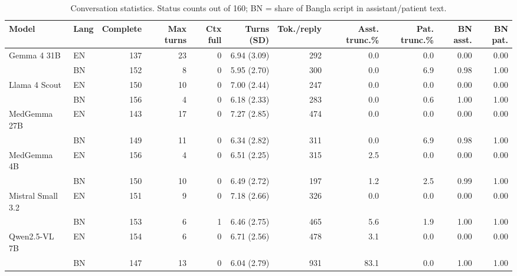 \begin{table}[!htbp]
\centering
\scriptsize
\begin{tabular}{llrrrrrrrrr}
\toprule
Model & Lang & Complete & Max turns & Ctx full & Turns (SD) & Tok./reply & Asst. trunc.\% & Pat. trunc.\% & BN asst. & BN pat. \\
\midrule
Gemma 4 31B & EN & 137 & 23 & 0 & 6.94 (3.09) & 292 & 0.0 & 0.0 & 0.00 & 0.00 \\
 & BN & 152 & 8 & 0 & 5.95 (2.70) & 300 & 0.0 & 6.9 & 0.98 & 1.00 \\
Llama 4 Scout & EN & 150 & 10 & 0 & 7.00 (2.44) & 247 & 0.0 & 0.0 & 0.00 & 0.00 \\
 & BN & 156 & 4 & 0 & 6.18 (2.33) & 283 & 0.0 & 0.6 & 1.00 & 1.00 \\
MedGemma 27B & EN & 143 & 17 & 0 & 7.27 (2.85) & 474 & 0.0 & 0.0 & 0.00 & 0.00 \\
 & BN & 149 & 11 & 0 & 6.34 (2.82) & 311 & 0.0 & 6.9 & 0.98 & 1.00 \\
MedGemma 4B & EN & 156 & 4 & 0 & 6.51 (2.25) & 315 & 2.5 & 0.0 & 0.00 & 0.00 \\
 & BN & 150 & 10 & 0 & 6.49 (2.72) & 197 & 1.2 & 2.5 & 0.99 & 1.00 \\
Mistral Small 3.2 & EN & 151 & 9 & 0 & 7.18 (2.66) & 326 & 0.0 & 0.0 & 0.00 & 0.00 \\
 & BN & 153 & 6 & 1 & 6.46 (2.75) & 465 & 5.6 & 1.9 & 1.00 & 1.00 \\
Qwen2.5-VL 7B & EN & 154 & 6 & 0 & 6.71 (2.56) & 478 & 3.1 & 0.0 & 0.00 & 0.00 \\
 & BN & 147 & 13 & 0 & 6.04 (2.79) & 931 & 83.1 & 0.0 & 1.00 & 1.00 \\
\bottomrule
\end{tabular}
\caption{Conversation statistics. Status counts out of 160; BN = share of Bangla script in assistant/patient text.}
\label{tab:conv}
\end{table}
